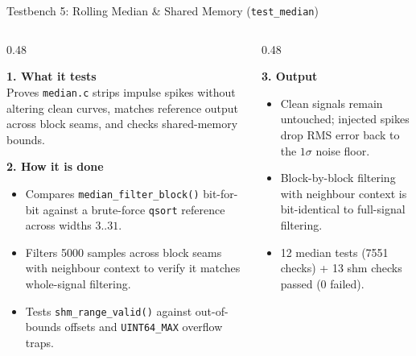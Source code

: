 \begin{frame}{Testbench 5: Rolling Median \& Shared Memory (\texttt{test\_median})}
  \begin{columns}[t, onlytextwidth]
    \begin{column}{0.48\textwidth}
      \smalltext\compactitem
      \begin{highlight}
        \textbf{1. What it tests} \\
        Proves \texttt{median.c} strips impulse spikes without altering clean curves, matches reference output across block seams, and checks shared-memory bounds.
      \end{highlight}
      \vskip0.5mm
      \begin{tech}
        \textbf{2. How it is done}
        \begin{itemize}
          \item Compares \texttt{median\_filter\_block()} bit-for-bit against a brute-force \texttt{qsort} reference across widths $3..31$.
          \item Filters 5000 samples across block seams with neighbour context to verify it matches whole-signal filtering.
          \item Tests \texttt{shm\_range\_valid()} against out-of-bounds offsets and \texttt{UINT64\_MAX} overflow traps.
        \end{itemize}
      \end{tech}
    \end{column}
    \begin{column}{0.48\textwidth}
      \smalltext\compactitem
      \begin{tech}
        \textbf{3. Output}
        \begin{itemize}
          \item Clean signals remain untouched; injected spikes drop RMS error back to the $1\sigma$ noise floor.
          \item Block-by-block filtering with neighbour context is bit-identical to full-signal filtering.
          \item \num{12 median tests (7551 checks) + 13 shm checks passed (0 failed)}.
        \end{itemize}
      \end{tech}
      \vskip1mm
    \end{column}
  \end{columns}
\end{frame}

